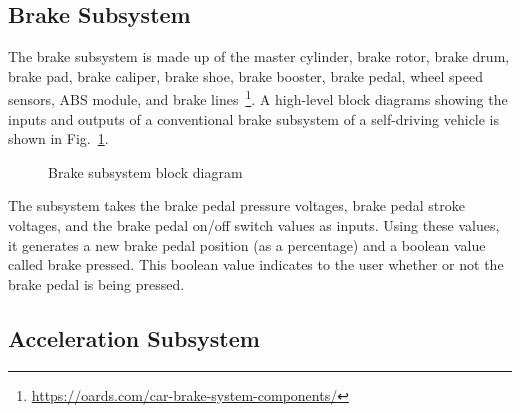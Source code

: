 \documentclass[conference]{IEEEtran}
\begin{document}
  \subsection{Brake Subsystem}
  The brake subsystem is made up of the master cylinder, brake rotor, brake drum, brake pad, brake caliper, brake shoe, brake booster, brake pedal, wheel speed sensors, ABS module, and brake lines~\footnote{\url{https://oards.com/car-brake-system-components/}}. A high-level block diagrams showing the inputs and outputs of a conventional brake subsystem of a self-driving vehicle is shown in Fig.~\ref{fig:brakeModelArchitecture}. %
%
 \begin{figure}[htbp]
    \centering
    \caption{Brake subsystem block diagram}
    \label{fig:brakeModelArchitecture}
\end{figure}
%
The subsystem takes the brake pedal pressure voltages, brake pedal stroke voltages, and the brake pedal on/off switch values as inputs. Using these values, it generates a new brake pedal position (as a percentage) and a boolean value called brake pressed. This boolean value indicates to the user whether or not the brake pedal is being pressed.

\subsection{Acceleration Subsystem}
\end{document}

